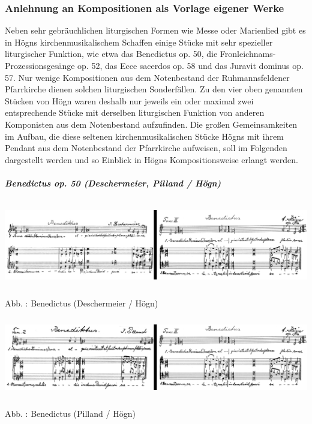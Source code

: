 \subsubsection{Anlehnung an Kompositionen als Vorlage eigener Werke}

\label{bkm:Ref96491192}\hypertarget{RefHeadingToc100333749}{}Neben sehr
gebräuchlichen liturgischen Formen wie Messe oder Marienlied gibt es in
Högns kirchenmusikalischem Schaffen einige Stücke mit sehr spezieller
liturgischer Funktion, wie etwa das Benedictus op. 50, die
Fronleichnams-Prozessionsgesänge op. 52, das Ecce sacerdos op. 58 und
das Juravit dominus op. 57. Nur wenige Kompositionen aus dem
Notenbestand der Ruhmannsfeldener Pfarrkirche dienen solchen
liturgischen Sonderfällen. Zu den vier oben genannten Stücken von Högn
waren deshalb nur jeweils ein oder maximal zwei entsprechende Stücke
mit derselben liturgischen Funktion von anderen Komponisten aus dem
Notenbestand aufzufinden. Die großen Gemeinsamkeiten im Aufbau, die
diese seltenen kirchenmusikalischen Stücke Högns mit ihrem Pendant aus
dem Notenbestand der Pfarrkirche aufweisen, soll im Folgenden
dargestellt werden und so Einblick in Högns Kompositionsweise erlangt
werden.

\subparagraph[Benedictus op. 50 (Deschermeier, Pilland /
Högn)]{Benedictus op. 50 (Deschermeier, Pilland / Högn)}

\includegraphics[width=15.977cm,height=3.671cm]{pictures/zulassungsarbeit-img080.png}


Abb. : Benedictus (Deschermeier / Högn)


\includegraphics[width=15.977cm,height=3.478cm]{pictures/zulassungsarbeit-img081.png}


Abb. : Benedictus (Pilland / Högn)

